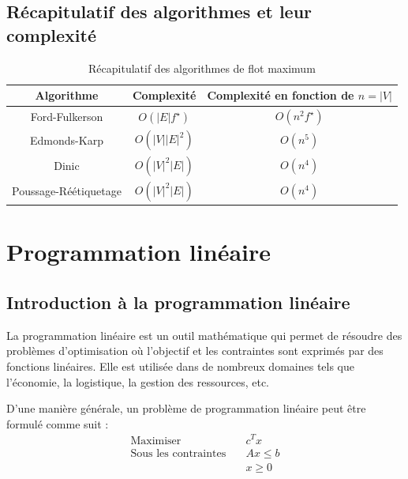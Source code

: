 \documentclass[a4paper]{article}
\begin{document}
\subsection{Récapitulatif des algorithmes et leur complexité}
\begin{table}[H]
	\centering
	\begin{tabular}{|c|c|c|}
		\hline
		Algorithme & Complexité & Complexité en fonction de $n = |V|$ \\
		\hline
		Ford-Fulkerson & $O(|E|f^\star)$ &$O(n^2 f^\star)$\\
		Edmonds-Karp & $O(|V||E|^2)$ &$O(n^5)$\\
		Dinic & $O(|V|^2|E|)$& $O(n^4)$\\
		Poussage-Réétiquetage & $O(|V|^2|E|)$&$O(n^4)$ \\
		\hline
	\end{tabular}
	\caption{Récapitulatif des algorithmes de flot maximum}
\end{table}


\section{Programmation linéaire}
\label{sec:pl}

\subsection{Introduction à la programmation linéaire}
La programmation linéaire est un outil mathématique qui permet de résoudre des problèmes d'optimisation où l'objectif et les contraintes sont exprimés par des fonctions linéaires.
Elle est utilisée dans de nombreux domaines tels que l'économie, la logistique, la gestion des ressources, etc.

D'une manière générale, un problème de programmation linéaire peut être formulé comme suit :
\begin{align*}
	\text{Maximiser} \quad & c^T x \\
	\text{Sous les contraintes} \quad
	& Ax \leq b \\
	& x \geq 0
\end{align*}
\end{document}
